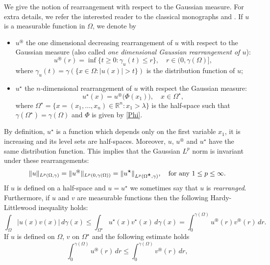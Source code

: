 \documentclass[a4paper,10pt,reqno]{amsart}
\numberwithin{equation}{section}
\begin{document}
We give the notion of rearrangement with respect to the Gaussian measure. For extra details,
we refer the interested reader to the classical monographs \cite{Bennett} and \cite{CR}.
If $u$ is a measurable function in $\Omega$, we denote by
\begin{itemize}
\item $u^{\circledast}$ the one dimensional decreasing rearrangement of $u$ with respect
to the Gaussian measure (also called \emph{one dimensional Gaussian rearrangement of $u$}):
$$u^{\circledast}(r)=\inf\{t\geq0:\gamma_{u}(t)\leq r\},\quad r\in(0,\gamma(\Omega)],$$
where $\gamma_{u}(t)=\gamma(\{x\in\Omega:\left\vert u(x)\right\vert>t\})$ is the distribution function of $u$;
\item $u^{\displaystyle\star}$ the $n$-dimensional rearrangement of $u$ with respect the Gaussian measure:
$$u^{\displaystyle\star}(x)=u^{\circledast}\big(\Phi(x_{1})\big),\quad x\in\Omega^{\displaystyle\star},$$
where $\Omega^{\displaystyle\star}=\{x=(  x_{1},\ldots,x_{n})\in\mathbb{R}^{n}:x_{1}>\lambda\}$ is the
half-space such that $\gamma(\Omega^{\displaystyle\star})=\gamma(\Omega)$
and $\Phi$ is given by \eqref{Phi}.
\end{itemize}
By definition, $u^{\displaystyle\star}$ is a function which depends
only on the first variable $x_{1}$, it is increasing and its level sets are half-spaces. Moreover,
$u$, $u^{\circledast}$ and $u^{\displaystyle\star}$ have the same
distribution function. This implies that the Gaussian $L^{p}$ norm is invariant under these rearrangements:
$$\|u\|_{L^{p}(\Omega,\gamma)}=\|u^{\circledast}\|_{L^{p}(0,\gamma(\Omega))}=\|u^{{\displaystyle\star}}\|_{L^{p}(\Omega^{{\displaystyle\star}},\gamma)},\quad\hbox{for
any}~1\leq p\leq\infty.$$
If $u$ is defined on a half-space and $u=u^{\displaystyle\star}$ we sometimes say that $u$ is \emph{rearranged}. Furthermore,
if $u$ and $v$ are
measurable functions then the following Hardy-Littlewood inequality holds:
\begin{equation}
\int_{\Omega}|u(x)v(x)|\,d\gamma(x)\leq\int_{\Omega^{\displaystyle\star}}
u^{\displaystyle\star}(x)v^{\displaystyle\star}(x)\,d\gamma(x)
=\int_{0}^{\gamma(\Omega)}u^{\circledast}(r)v^{\circledast}(r)\,dr.
\label{Hardy-Litt}%
\end{equation}
If $u$ is defined on $\Omega$, $v$ on $\Omega^{\displaystyle\star}$ and
the following estimate holds
\begin{equation}
\int_{0}^{\gamma(\Omega)}u^{\circledast}(r)\,dr\leq \int_{0}^{\gamma(\Omega)}v^{\circledast}(r)\,dr,\label{massconcent}
\end{equation}
\end{document}
